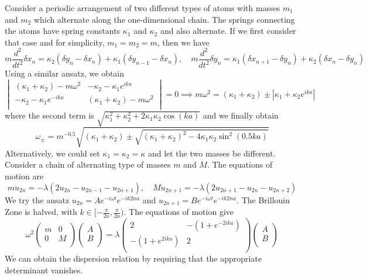 \documentclass[a4paper]{article}
\begin{document}
\begin{Note}
Consider a periodic arrangement of two different types of atoms with masses $m_1$ and $m_2$ which alternate along the one-dimensional chain. The springs connecting the atoms have spring constants $\kappa_1$ and $\kappa_2$ and also alternate. If we first consider that case and for simplicity, $m_1=m_2=m$, then we have 
$$m\frac{d^2}{dt^2}\delta x_n=\kappa_2(\delta y_n-\delta x_n)+\kappa_1(\delta y_{n-1}-\delta x_n),\quad m\frac{d^2}{dt^2}\delta y_n=\kappa_1(\delta x_{n+1}-\delta y_n)+\kappa_2(\delta x_n-\delta y_n)$$
Using a similar ansatz, we obtain
$$\begin{vmatrix}(\kappa_1+\kappa_2)-m\omega^2&-\kappa_2-\kappa_1e^{ika}\\-\kappa_2-\kappa_1e^{-ika}&(\kappa_1+\kappa_2)-m\omega^2\\\end{vmatrix}=0\implies m\omega^2=(\kappa_1+\kappa_2)\pm|\kappa_1+\kappa_2e^{ika}|$$
where the second term is $\sqrt{\kappa_1^2+\kappa_2^2+2\kappa_1\kappa_2\cos(ka)}$ and we finally obtain
$$\omega_{\pm}=m^{-0.5}\sqrt{(\kappa_1+\kappa_2)\pm\sqrt{(\kappa_1+\kappa_2)^2-4\kappa_1\kappa_2\sin^2(0.5ka)}}$$
Alternatively, we could set $\kappa_1=\kappa_2=\kappa$ and let the two masses be different. Consider a chain of alternating type of masses $m$ and $M$. The equations of motion are
$$m\ddot{u}_{2n}=-\lambda(2u_{2n}-u_{2n-1}-u_{2n+1}),\quad M\ddot{u}_{2n+1}=-\lambda(2u_{2n+1}-u_{2n}-u_{2n+2})$$
We try the ansatz $u_{2n}=Ae^{-i\omega t}e^{-ik2na}$ and $u_{2n+1}=Be^{-i\omega t}e^{-ik 2na}$. The Brillouin Zone is halved, with $k\in[-\frac{\pi}{2a},\frac{\pi}{2a})$. The equations of motion give
$$\omega^2\begin{pmatrix}m&0\\0&M\\\end{pmatrix}\begin{pmatrix}A\\B\\\end{pmatrix}=\lambda\begin{pmatrix}2&-(1+e^{-2ika})\\-(1+e^{2ika})&2\\\end{pmatrix}\begin{pmatrix}A\\B\\\end{pmatrix}$$
We can obtain the dispersion relation by requiring that the appropriate determinant vanishes.

\end{Note}
\end{document}
